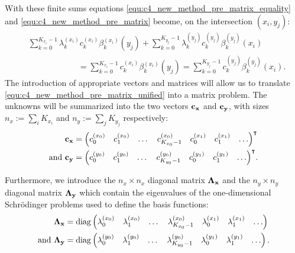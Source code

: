With these finite sums equations \eqref{equ:c4_new_method_pre_matrix_equality} and \eqref{equ:c4_new_method_pre_matrix} become, on the intersection $(x_i, y_j)$:
\begin{align}
     & \sum_{k=0}^{K_{x_i}-1} \lambda_k^{(x_i)} c_k^{(x_i)} \beta^{(x_i)}_k(y_j) + \sum_{k=0}^{K_{y_j}-1} \lambda_k^{(y_j)} c_k^{(y_j)} \beta_k^{(y_j)}(x_i)\nonumber                                  \\
     & \qquad\qquad\qquad     = \sum_{k=0}^{K_{x_i}-1} c_k^{(x_i)} \beta_k^{(x_i)}(y_j) = \sum_{k=0}^{K_{y_j}-1} c_k^{(y_j)} \beta_k^{(y_j)}(x_i) \text{.}\label{equ:c4_new_method_pre_matrix_unified}
\end{align}
The introduction of appropriate vectors and matrices will allow us to translate \eqref{equ:c4_new_method_pre_matrix_unified} into a matrix problem. The unknowns will be summarized into the two vectors $\vb{c_x}$ and $\vb{c_y}$, with sizes $n_x := \sum_i K_{x_i}$ and $n_y := \sum_j K_{y_j}$ respectively:
\begin{align*}
    \vb{c_x}            & = {\begin{pmatrix} c_0^{(x_0)} & c_1^{(x_0)} & \dots & c_{K_{x_0}-1}^{(x_0)} & c_0^{(x_1)} & c_1^{(x_1)} & \dots \end{pmatrix}}^\intercal         \\
    \text{and }\vb{c_y} & = {\begin{pmatrix} c_0^{(y_0)} & c_1^{(y_0)} & \dots & c_{K_{y_0}-1}^{(y_0)} & c_0^{(y_1)} & c_1^{(y_1)} & \dots \end{pmatrix}}^\intercal\text{.}
\end{align*}

Furthermore, we introduce the $n_x \times n_x$ diagonal matrix $\vb{\Lambda_x}$ and the $n_y \times n_y$ diagonal matrix $\vb{\Lambda_y}$ which contain the eigenvalues of the one-dimensional Schrödinger problems used to define the basis functions:
\begin{align*}
    \vb{\Lambda_x}            & = \operatorname{diag}\begin{pmatrix} \lambda_0^{(x_0)} & \lambda_1^{(x_0)} & \dots & \lambda_{K_{x_0}-1}^{(x_0)} & \lambda_0^{(x_1)} & \lambda_1^{(x_1)} & \dots \end{pmatrix}         \\
    \text{and }\vb{\Lambda_y} & = \operatorname{diag}\begin{pmatrix} \lambda_0^{(y_0)} & \lambda_1^{(y_0)} & \dots & \lambda_{K_{y_0}-1}^{(y_0)} & \lambda_0^{(y_1)} & \lambda_1^{(y_1)} & \dots \end{pmatrix}\text{.} \\
\end{align*}

